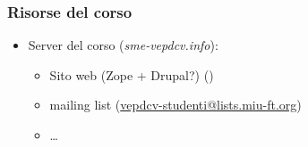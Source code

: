 %
%
%
%
%
\setcounter{ms}{0}
\begin{frame}
    \frametitle{Risorse del corso}

	\begin{itemize}[<+- | alert@+->]

		\item Server del corso (\emph{sme-vepdcv.info}):

		\begin{itemize}[<+- | alert@+->]

			\item Sito web (Zope + Drupal?)
			      ()

			\item mailing list
				(\href{mailto:vepdcv-studenti@lists.miu-ft.org}
				      {vepdcv-studenti@lists.miu-ft.org})

			\item \ldots

		\end{itemize}

	\end{itemize}

\end{frame}
